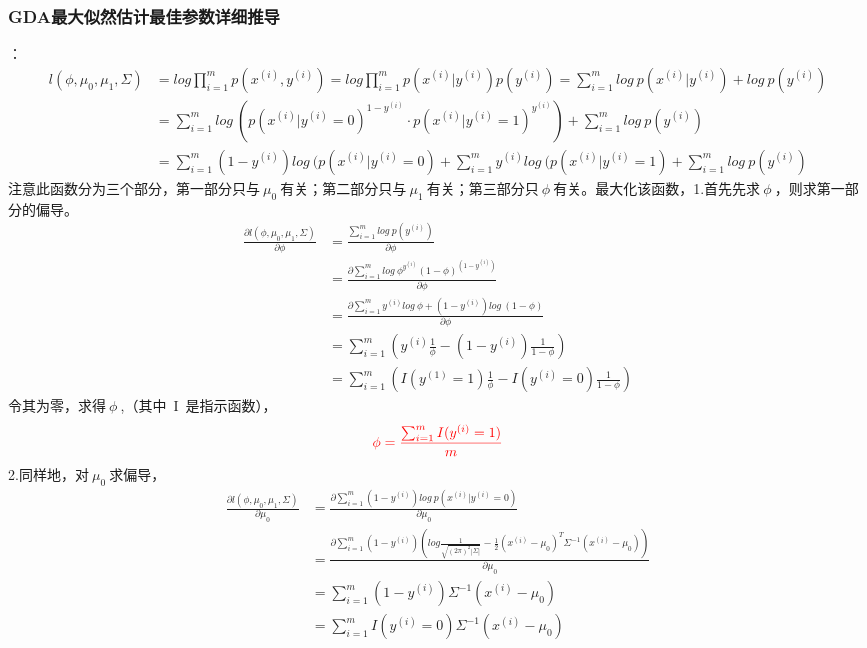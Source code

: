 \subsubsection{GDA最大似然估计最佳参数详细推导}
：
\begin{equation}\nonumber
\begin{split}
  l(\phi,\mu_0,\mu_1,\Sigma)&=log\prod_{i=1}^{m}p(x^{(i)},y^{(i)})=log\prod_{i=1}^{m}p(x^{(i)}|y^{(i)})p(y^{(i)})=\sum_{i=1}^{m}log~p(x^{(i)}|y^{(i)})+log~p(y^{(i)})\\
                            &=\sum_{i=1}^{m}log~(p(x^{(i)}|y^{(i)}=0)^{1-y^{(i)}}\cdot p(x^{(i)}|y^{(i)}=1)^{y^{(i)}})+\sum_{i=1}^{m}log~p(y^{(i)})\\
                            &=\sum_{i=1}^{m}(1-y^{(i)})log~(p(x^{(i)}|y^{(i)}=0)+\sum_{i=1}^{m}y^{(i)}log~(p(x^{(i)}|y^{(i)}=1)+\sum_{i=1}^{m}log~p(y^{(i)})
\end{split}
\end{equation}
注意此函数分为三个部分，第一部分只与$~\mu_0~$有关；第二部分只与$~\mu_1~$有关；第三部分只$~\phi~$有关。最大化该函数，1.首先先求$~\phi~$，则求第一部分的偏导。
\begin{equation}\nonumber
\begin{split}
  \frac{\partial l(\phi,\mu_0,\mu_1,\Sigma)}{\partial\phi }&=\frac{\sum_{i=1}^{m}log~p(y^{(i)})}{\partial\phi}\\
   &=\frac{\partial\sum_{i=1}^{m}log~\phi^{y^{(i)}}(1-\phi)^{(1-y^{(i)})}}{\partial\phi}\\
   &=\frac{\partial\sum_{i=1}^{m}y^{(i)}log~\phi+(1-y^{(i)})log~(1-\phi)}{\partial\phi}\\
   &=\sum_{i=1}^{m}(y^{(i)}\frac{1}{\phi}-(1-y^{(i)})\frac{1}{1-\phi})\\
   &=\sum_{i=1}^{m}(I(y^{(1)}=1)\frac{1}{\phi}-I(y^{(i)}=0)\frac{1}{1-\phi})
\end{split}
\end{equation}
令其为零，求得$~\phi~$,（其中~I~是指示函数），
\begin{equation}\nonumber
\begin{split}
  {\color{red}{\phi=\frac{\sum_{i=1}^{m}I(y^{(i)}=1)}{m}}}
\end{split}
\end{equation}
2.同样地，对$~\mu_0~$求偏导，
\begin{equation}\nonumber
\begin{split}
  \frac{\partial l(\phi,\mu_0,\mu_1,\Sigma)}{\partial\mu_0}&=\frac{\partial\sum_{i=1}^{m}(1-y^{(i)})log~p(x^{(i)}|y^{(i)}=0)}{\partial\mu_0}\\
    &=\frac{\partial\sum_{i=1}^{m}(1-y^{(i)})(log\frac{1}{\sqrt{(2\pi)^2|\Sigma|}}-\frac{1}{2}(x^{(i)}-\mu_0)^T\Sigma^{-1}(x^{(i)}-\mu_0))}{\partial\mu_0}\\
    &=\sum_{i=1}^{m}(1-y^{(i)})\Sigma^{-1}(x^{(i)}-\mu_0)\\
    &=\sum_{i=1}^{m}I(y^{(i)}=0)\Sigma^{-1}(x^{(i)}-\mu_0)\\
\end{split}
\end{equation}
